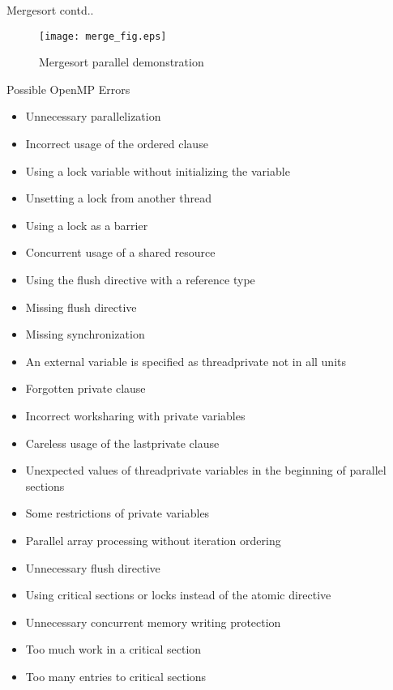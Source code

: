 \documentclass[10pt]{beamer}
\begin{document}
\begin{frame}{Mergesort contd..}
\begin{figure}
\begin{center}
\texttt{[image: merge\_fig.eps]}
\caption{Mergesort parallel demonstration}
\end{center}
\end{figure}
\end{frame}


\begin{frame}[shrink]{Possible OpenMP Errors}
\begin{itemize}
\item Unnecessary parallelization
\item Incorrect usage of the ordered clause
\item Using a lock variable without initializing the variable
\item Unsetting a lock from another thread
\item Using a lock as a barrier
\item Concurrent usage of a shared resource
\item Using the flush directive with a reference type
\item Missing flush directive
\item Missing synchronization
\item An external variable is specified as threadprivate not in all units
\item Forgotten private clause
\item Incorrect worksharing with private variables
\item Careless usage of the lastprivate clause
\item Unexpected values of threadprivate variables in the beginning of parallel sections
\item Some restrictions of private variables
\item Parallel array processing without iteration ordering
\item Unnecessary flush directive
\item Using critical sections or locks instead of the atomic directive
\item Unnecessary concurrent memory writing protection
\item Too much work in a critical section
\item Too many entries to critical sections
\end{itemize}
\end{frame}
\end{document}
